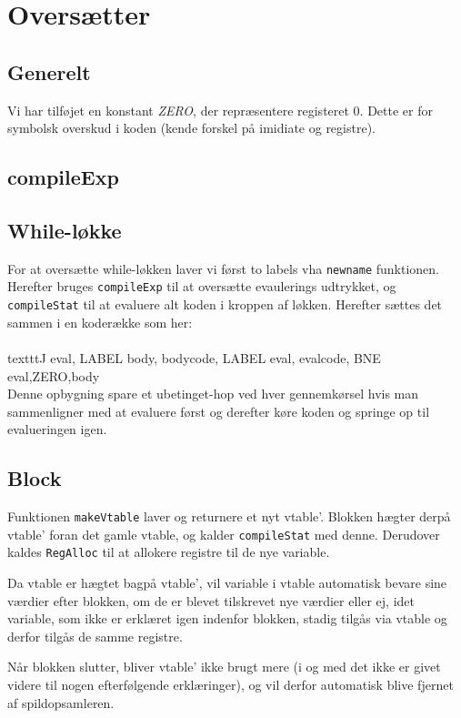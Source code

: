 \documentclass[a4paper, 10pt]{article}
\begin{document}
\section{Oversætter}

\subsection{Generelt}
Vi har tilføjet en konstant \textit{ZERO}, der repræsentere registeret 0. Dette
er for symbolsk overskud i koden (kende forskel på imidiate og registre).


\subsection{compileExp}


\subsection{While-løkke}
For at oversætte while-løkken laver vi først to labels vha \texttt{newname} funktionen.
Herefter bruges \texttt{compileExp} til at oversætte evaulerings udtrykket, og \texttt{compileStat} 
til at evaluere alt koden i kroppen af løkken. Herefter sættes det sammen i en koderække som her:\\
\\texttt{\center J eval, LABEL body, bodycode, LABEL eval, evalcode, BNE eval,ZERO,body}\\
Denne opbygning spare et ubetinget-hop ved hver gennemkørsel hvis man sammenligner med at evaluere 
først og derefter køre koden og springe op til evalueringen igen.



\subsection{Block}
Funktionen \texttt{makeVtable} laver og returnere et nyt vtable'. Blokken
hægter derpå vtable' foran det gamle vtable, og kalder \texttt{compileStat} med
denne. Derudover kaldes \texttt{RegAlloc} til at allokere registre til de nye
variable.

Da vtable er hægtet bagpå vtable', vil variable i vtable automatisk bevare
sine værdier efter blokken, om de er blevet tilskrevet nye værdier eller ej,
idet variable, som ikke er erklæret igen indenfor blokken, stadig tilgås via
vtable og derfor tilgås de samme registre.

Når blokken slutter, bliver vtable' ikke brugt mere (i og med det ikke er givet
videre til nogen efterfølgende erklæringer), og vil derfor automatisk blive
fjernet af spildopsamleren.
\end{document}
